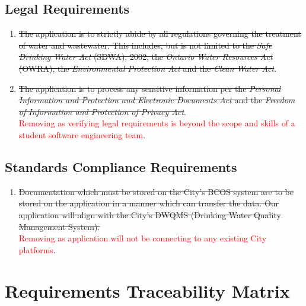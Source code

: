\documentclass[12pt]{article}
\begin{document}
\subsection{Legal Requirements}
\begin{enumerate}[{CR-L}1.]
  \item \sout{The application is to strictly abide by all regulations governing
      the treatment of water and wastewater. This includes, but is not limited
      to the \textit{Safe Drinking Water Act} (SDWA), 2002, the
      \textit{Ontario Water Resources Act} (OWRA), the
    \textit{Environmental Protection Act} and the \textit{Clean Water Act}}.\\
  \item \sout{The application is to process any sensitive information per the
      \textit{Personal Information and Protection and Electronic
      Documents Act} and
    the \textit{Freedom of Information and Protection of Privacy Act}}.\\
    \textcolor{red}{Removing as verifying legal requirements is
    beyond the scope and skills of a student software engineering team}.
\end{enumerate}
\subsection{Standards Compliance Requirements}
\begin{enumerate}[{CR-S}1.]
  \item \sout{Documentation which must be stored on the City's BCOS
      system are to be stored on the application in a manner which can
      transfer the data. Our application will align with the City's
    DWQMS (Drinking Water Quality Management System).}\\
    \textcolor{red}{Removing as application will not be connecting to
    any existing City platforms}.
\end{enumerate}

\section{Requirements Traceability Matrix}
\end{document}
